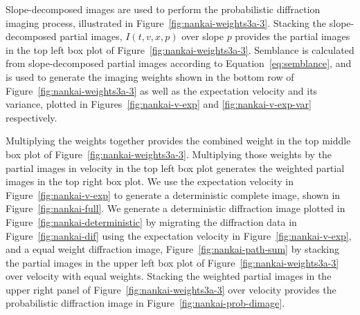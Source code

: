 Slope-decomposed images are used to perform the probabilistic diffraction imaging process, illustrated in Figure~\ref{fig:nankai-weights3a-3}.   Stacking the slope-decomposed partial images, $I(t,v,x,p)$ over slope $p$ provides the partial images in the top left box plot of Figure~\ref{fig:nankai-weights3a-3}.  Semblance is  calculated from slope-decomposed partial images according to Equation~\ref{eq:semblance}, and is used to generate the imaging weights shown in the bottom row of Figure~\ref{fig:nankai-weights3a-3} as well as the expectation velocity and its variance, plotted in Figures~\ref{fig:nankai-v-exp} and \ref{fig:nankai-v-exp-var} respectively.




Multiplying the weights together provides the combined weight in the top middle box plot of Figure~\ref{fig:nankai-weights3a-3}.  Multiplying those weights by the partial images in velocity in the top left box plot generates the weighted partial images in the top right box plot.    We use the expectation velocity in Figure~\ref{fig:nankai-v-exp} to generate a deterministic complete image, shown in Figure~\ref{fig:nankai-full}. We  generate a deterministic diffraction image plotted in Figure~\ref{fig:nankai-deterministic} by migrating the diffraction data in Figure~\ref{fig:nankai-dif} using the expectation velocity in Figure~\ref{fig:nankai-v-exp}, and a equal weight diffraction image, Figure~\ref{fig:nankai-path-sum} by stacking the partial images in the upper left box plot of Figure~\ref{fig:nankai-weights3a-3} over velocity with equal weights. Stacking the weighted partial images in the upper right panel of Figure~\ref{fig:nankai-weights3a-3} over velocity provides the probabilistic diffraction image in Figure~\ref{fig:nankai-prob-dimage}.


